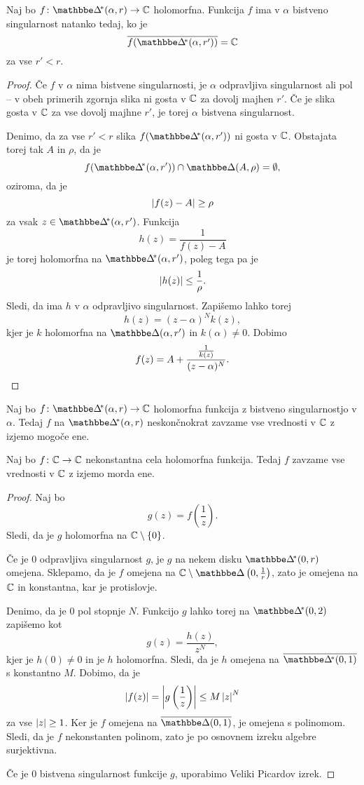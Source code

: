 \begin{izrek}
Naj bo $f \colon \dskx(\alpha, r) \to \C$ holomorfna. Funkcija $f$
ima v $\alpha$ bistveno singularnost natanko tedaj, ko je
\[
\oline{f(\dskx(\alpha, r'))} = \C
\]
za vse $r' < r$.
\end{izrek}

\begin{proof}
Če $f$ v $\alpha$ nima bistvene singularnosti, je $\alpha$
odpravljiva singularnost ali pol -- v obeh primerih zgornja slika
ni gosta v $\mathbb{C}$ za dovolj majhen $r'$. Če je slika gosta v $\mathbb{C}$ za
vse dovolj majhne $r'$, je torej $\alpha$ bistvena singularnost.

Denimo, da za vse $r' < r$ slika $f(\dskx(\alpha, r'))$ ni
gosta v $\mathbb{C}$. Obstajata torej tak $A$ in $\rho$, da je
\[
f(\dskx(\alpha, r')) \cap \dsk(A, \rho) = \emptyset,
\]
oziroma, da je
\[
\left\lvert f(z) - A\right\rvert \geq \rho
\]
za vsak $z \in \dskx(\alpha, r')$. Funkcija
\[
h(z) = \frac{1}{f(z) - A}
\]
je torej holomorfna na $\dskx(\alpha, r')$, poleg tega pa je
\[
\left\lvert h(z)\right\rvert \leq \frac{1}{\rho}.
\]
Sledi, da ima $h$ v $\alpha$ odpravljivo singularnost. Zapišemo
lahko torej
\[
h(z) = (z - \alpha)^N k(z),
\]
kjer je $k$ holomorfna na $\dsk(\alpha, r')$ in $k(\alpha) \ne 0$.
Dobimo
\[
f(z) = A + \frac{\frac{1}{k(z)}}{(z - \alpha)^N}. \qedhere
\]
\end{proof}

\begin{izrek}
Naj bo $f \colon \dskx(\alpha, r) \to \C$ holomorfna funkcija z
bistveno singularnostjo v $\alpha$. Tedaj $f$ na $\dskx(\alpha, r)$
neskončnokrat zavzame vse vrednosti v $\mathbb{C}$ z izjemo mogoče ene.
\end{izrek}

\begin{izrek}
\label{iz:mpc}
Naj bo $f \colon \mathbb{C} \to \mathbb{C}$ nekonstantna cela holomorfna funkcija.
Tedaj $f$ zavzame vse vrednosti v $\mathbb{C}$ z izjemo morda ene.
\end{izrek}

\begin{proof}
Naj bo
\[
g(z) = f\left(\frac{1}{z}\right).
\]
Sledi, da je $g$ holomorfna na $\mathbb{C} \setminus \left\{0\right\}$.

Če je $0$ odpravljiva singularnost $g$, je $g$ na nekem disku
$\dskx(0, r)$ omejena. Sklepamo, da je $f$ omejena na
$\C \setminus \dsk\left(0, \frac{1}{r}\right)$, zato je omejena na
$\mathbb{C}$ in konstantna, kar je protislovje.

Denimo, da je $0$ pol stopnje $N$. Funkcijo $g$ lahko torej na
$\dskx(0, 2)$ zapišemo kot
\[
g(z) = \frac{h(z)}{z^N},
\]
kjer je $h(0) \ne 0$ in je $h$ holomorfna. Sledi, da je $h$ omejena
na $\oline{\dskx(0, 1)}$ s konstantno $M$. Dobimo, da je
\[
\left\lvert f(z)\right\rvert = \left\lvert g\left(\frac{1}{z}\right)\right\rvert \leq M \left\lvert z\right\rvert^N
\]
za vse $\left\lvert z\right\rvert \geq 1$. Ker je $f$ omejena na $\oline{\dsk(0,1)}$,
je omejena s polinomom. Sledi, da je $f$ nekonstanten polinom, zato
je po osnovnem izreku algebre surjektivna.

Če je $0$ bistvena singularnost funkcije $g$, uporabimo Veliki
Picardov izrek.
\end{proof}

